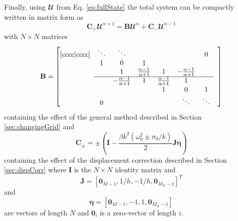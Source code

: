 Finally, using $\mathbfcal{U}$ from Eq. \eqref{eq:fullState} the total system can be compactly written in matrix form as
\begin{equation}\label{eq:totalSystem}
    \mathbf{C}_+\mathbfcal{U}^{n+1} = 
    \mathbf{B}
    \mathbfcal{U}^n
    + \mathbf{C}_-\mathbfcal{U}^{n-1}
\end{equation}
with $ N \times N$ matrices
\begin{equation}\label{eq:bMat}
    \mathbf{B} = 
    \begin{bmatrix}[cccc|cccc]
        & \ddots  &\ddots & & & & 0 & \\
          & 1 & 0 & 1 & & & & \\
         & & 1 & \frac{\alpha - 1}{\alpha + 1} & 1  & -\frac{\alpha - 1}{\alpha + 1} & \\ \cline{2-7}
         & & -\frac{\alpha - 1}{\alpha + 1} & 1  & \frac{\alpha - 1}{\alpha + 1}  & 1 & & \\
            & & & &1 & 0 & 1  \\
            & 0 & &  &  &\ddots & \ddots &
       \end{bmatrix}
\end{equation}
containing the effect of the general method described in Section \ref{sec:changingGrid} and
\begin{equation}\label{eq:CMat}
    \mathbf{C}_\pm = \pm\left(\mathbf{I} - \frac{\beta k^2 (\omega_0^2\pm\sigma_0/k)}{2}\mathbf{J}\boldsymbol{\eta}\right)
\end{equation}
containing the effect of the displacement correction described in Section \ref{sec:dispCorr} where $\mathbf{I}$ is the $ N \times N$ identity matrix and 
\begin{equation}
    \mathbf{J} = [\mathbf{0}_{M-1}, 1/h, -1/h, \mathbf{0}_{M_w-1}]^T
\end{equation}
and 
\begin{equation}
    \boldsymbol{\eta} = [\mathbf{0}_{M-1}, -1, 1, \mathbf{0}_{M_w-1}]
\end{equation}
are vectors of length $ N$ and $\boldsymbol{0}_i$ is a zero-vector of length $i$.
%
